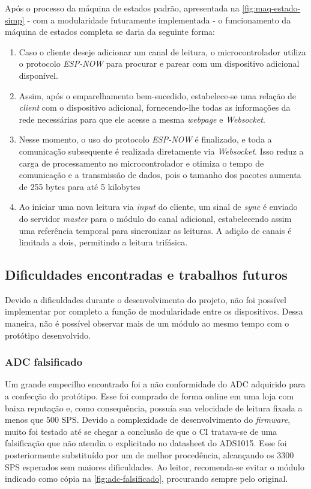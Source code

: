 Após o processo da máquina de estados padrão, apresentada na \autoref{fig:maq-estado-simp} - com a modularidade futuramente implementada - o funcionamento da máquina de estados completa se daria da seguinte forma:
\begin{enumerate}
    \item Caso o cliente deseje adicionar um canal de leitura, o microcontrolador utiliza o protocolo \textit{ESP-NOW} para procurar e parear com um dispositivo adicional disponível.
    
    \item Assim, após o emparelhamento bem-sucedido, estabelece-se uma relação de \textit{client} com o dispositivo adicional, fornecendo-lhe todas as informações da rede necessárias para que ele acesse a mesma \textit{webpage} e \textit{Websocket}.
    
    \item Nesse momento, o uso do protocolo \textit{ESP-NOW} é finalizado, e toda a comunicação subsequente é realizada diretamente via \textit{Websocket}. Isso reduz a carga de processamento no microcontrolador e otimiza o tempo de comunicação e a transmissão de dados, pois o tamanho dos pacotes aumenta de 255 bytes para até 5 kilobytes
    
    \item Ao iniciar uma nova leitura via \textit{input} do cliente, um sinal de \textit{sync} é enviado do servidor \textit{master} para o módulo do canal adicional, estabelecendo assim uma referência temporal para sincronizar as leituras. A adição de canais é limitada a dois, permitindo a leitura trifásica.
\end{enumerate}

\subsection{Dificuldades encontradas e trabalhos futuros}\label{dificuldades-futuro}

Devido a dificuldades durante o desenvolvimento do projeto, não foi possível implementar por completo a função de modularidade entre os dispositivos. Dessa maneira, não é possível observar mais de um módulo ao mesmo tempo com o protótipo desenvolvido.

\subsubsection{ADC falsificado}\label{adc-falso}

Um grande empecilho encontrado foi a não conformidade do \gls{ADC} adquirido para a confecção do protótipo. Esse foi comprado de forma online em uma loja com baixa reputação e, como consequência, possuía sua velocidade de leitura fixada a menos que 500 \gls{SPS}. Devido a complexidade de desenvolvimento do \textit{firmware}, muito foi testado até se chegar a conclusão de que o CI tratava-se de uma falsificação que não atendia o explicitado no datasheet do ADS1015. Esse foi posteriormente substituído por um de melhor procedência, alcançando os 3300 \gls{SPS} esperados sem maiores dificuldades.
Ao leitor, recomenda-se evitar o módulo indicado como cópia na \autoref{fig:adc-falsificado}, procurando sempre pelo original.

